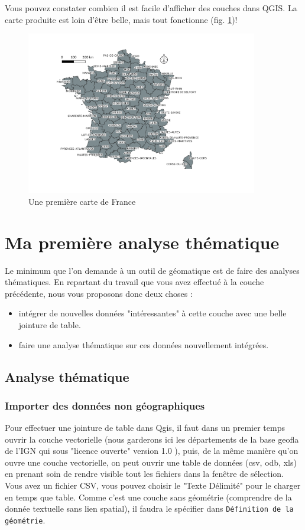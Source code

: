 \documentclass[a4paper, 11pt]{article}
\begin{document}
Vous pouvez constater combien il est facile d’afficher des couches dans QGIS. La carte produite est loin d'être belle, mais tout fonctionne (fig. \ref{fig:carte1})!

\begin{figure}
\centering
  \includegraphics[width=0.9\textwidth]{img/carte_france1}
  \caption{Une première carte de France}\label{fig:carte1}
\end{figure}

\section{Ma première analyse thématique}
Le minimum que l'on demande à un outil de géomatique est de faire des analyses thématiques. En repartant du travail que vous avez effectué à la couche précédente, nous vous proposons donc deux choses :
  \begin{itemize}
    \item intégrer de nouvelles données "intéressantes" à cette couche avec une belle jointure de table.
    \item faire une analyse thématique sur ces données nouvellement intégrées.
  \end{itemize}

  \subsection{Analyse thématique}
  \subsubsection{Importer des données non géographiques}\label{part:chargerData}
  Pour effectuer une jointure de table dans Qgis, il faut dans un premier temps ouvrir la couche vectorielle (nous garderons ici les départements de la base geofla de l'IGN qui sous "licence ouverte" version 1.0 ), puis, de la même manière qu'on ouvre une couche vectorielle, on peut ouvrir une table de données (csv, odb, xls) en prenant soin de rendre visible tout les fichiers dans la fenêtre de sélection. Vous avez un fichier CSV, vous pouvez choisir le "Texte Délimité" pour le charger en temps que table. Comme c'est une couche sans géométrie (comprendre de la donnée textuelle sans lien spatial), il faudra le spécifier dans \texttt{Définition de la géométrie}.
\end{document}
